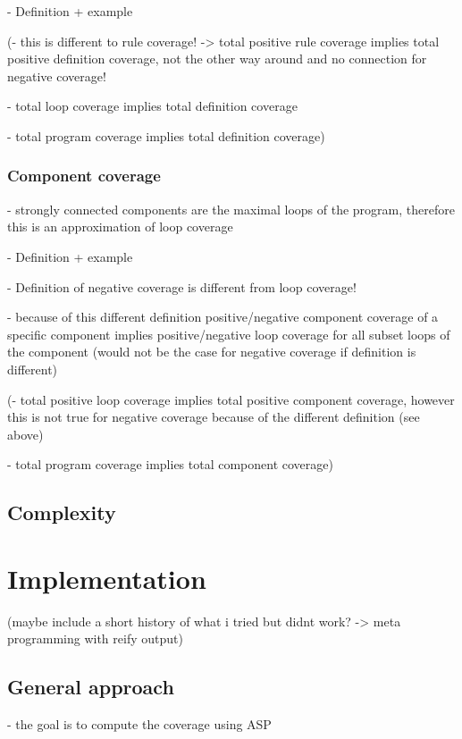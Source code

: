 - Definition + example

(- this is different to rule coverage! -> total positive rule coverage implies total positive definition coverage, not the other 
way around and no connection for negative coverage!

- total loop coverage implies total definition coverage

- total program coverage implies total definition coverage)

\subsection{Component coverage}
\label{subsec:Coverage cetrics/Branch-like coverage/Component coverage}
- strongly connected components are the maximal loops of the program, therefore this is an approximation of loop coverage

- Definition + example

- Definition of negative coverage is different from loop coverage!

- because of this different definition positive/negative component coverage of a specific component implies positive/negative loop 
coverage for all subset loops of the component (would not be the case for negative coverage if definition is different)

(- total positive loop coverage implies total positive component coverage, however this is not true for negative coverage because 
of the different definition (see above)

- total program coverage implies total component coverage)

\section{Complexity}
\label{sec:Coverage metrics/Complexity}         %

\chapter{Implementation}
\label{ch:Implementation}

(maybe include a short history of what i tried but didnt work? -> meta programming with reify output)

\section{General approach}
\label{sec:Implementation/General approach}
- the goal is to compute the coverage using ASP

